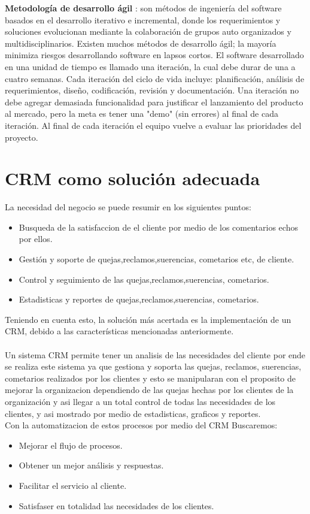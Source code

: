 \textbf{Metodolog\'ia de desarrollo \'agil }: son m\'etodos de ingenier\'ia del software basados en el desarrollo iterativo e incremental, donde los requerimientos y soluciones evolucionan mediante la colaboraci\'on de grupos auto organizados y multidisciplinarios. Existen muchos m\'etodos de desarrollo \'agil; la mayor\'ia minimiza riesgos desarrollando software en lapsos cortos. El software desarrollado en una unidad de tiempo es llamado una iteraci\'on, la cual debe durar de una a cuatro semanas. Cada iteraci\'on del ciclo de vida incluye: planificaci\'on, an\'alisis de requerimientos, dise\~no, codificaci\'on, revisi\'on y documentaci\'on. Una iteraci\'on no debe agregar demasiada funcionalidad para justificar el lanzamiento del producto al mercado, pero la meta es tener una "demo" (sin errores) al final de cada iteraci\'on. Al final de cada iteraci\'on el equipo vuelve a evaluar las prioridades del proyecto.%
\section{CRM como soluci\'on adecuada}
%
La necesidad del negocio se puede resumir en los siguientes puntos:%
%
\begin{itemize}
\item Busqueda de la satisfaccion de el cliente por medio de los comentarios echos por ellos.
\item Gesti\'on y soporte de quejas,reclamos,suerencias, cometarios etc, de cliente.
\item Control y seguimiento de las quejas,reclamos,suerencias, cometarios.
\item Estadisticas y reportes de quejas,reclamos,suerencias, cometarios.
\end{itemize}
%
Teniendo en cuenta esto, la soluci\'on m\'as acertada es la implementaci\'on de un CRM, debido a las caracter\'isticas mencionadas anteriormente.%
\\%
\\%
Un sistema CRM permite tener un analisis de las necesidades del cliente por ende se realiza este sistema ya que gestiona y soporta las quejas, reclamos, suerencias, cometarios realizados por los clientes y esto se manipularan con el proposito de mejorar la organizacion dependiendo de las quejas hechas por los clientes de la organizaci\'on y asi llegar a un total control de todas las necesidades de los clientes, y asi mostrado por medio de estadisticas, graficos y reportes.
\\%
Con la automatizacion  de estos procesos por medio del CRM Buscaremos:
%
\begin{itemize}
	\item Mejorar el flujo de procesos. 
	\item Obtener un mejor an\'alisis y respuestas.
	\item Facilitar el servicio al cliente.
	\item Satisfaser en totalidad las necesidades de los clientes.
\end{itemize}
%

